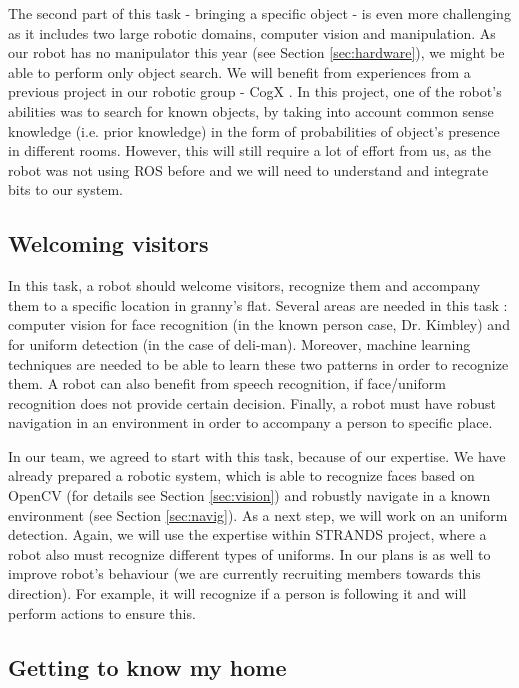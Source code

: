 \documentclass[conference]{IEEEtran}
\begin{document}
The second part of this task - bringing a specific object - is even more challenging as it includes two large robotic domains, computer vision and manipulation. As our robot has no manipulator this year (see Section \ref{sec:hardware}), we might be able to perform only object search. We will benefit from experiences from a previous project in our robotic group - CogX \cite{cogx}. In this project, one of the robot's abilities was to search for known objects, by taking into account common sense knowledge (i.e. prior knowledge) in the form of probabilities of object's presence in different rooms. However, this will still require a lot of effort from us, as the robot was not using ROS before and we will need to understand and integrate bits to our system. %

\subsection{Welcoming visitors}

In this task, a robot should welcome visitors, recognize them and accompany them to a specific location in granny's flat. Several areas are needed in this task : computer vision for face recognition (in the known person case, Dr. Kimbley) and for uniform detection (in the case of deli-man). Moreover, machine learning techniques are needed to be able to learn these two patterns in order to recognize them. A robot can also benefit from speech recognition, if face/uniform recognition does not provide certain decision. Finally, a robot must have robust navigation in an environment in order to accompany a person to specific place. 

In our team, we agreed to start with this task, because of our expertise. We have already prepared a robotic system, which is able to recognize faces based on OpenCV (for details see Section \ref{sec:vision}) and robustly navigate in a known environment (see Section \ref{sec:navig}). As a next step, we will work on an uniform detection. Again, we will use the expertise within STRANDS project, where a robot also must recognize different types of uniforms. In our plans is as well to improve robot's behaviour (we are currently recruiting members towards this direction). For example, it will recognize if a person is following it and will perform actions to ensure this.

\subsection{Getting to know my home}
\end{document}
